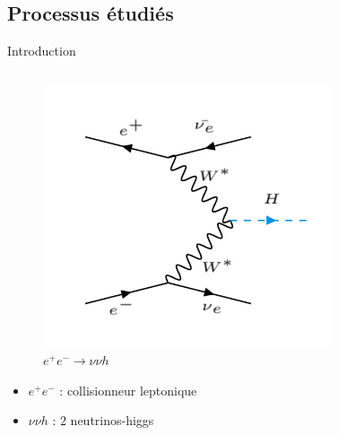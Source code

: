 \documentclass[9pt]{beamer}
\begin{document}
\subsection{Processus étudiés}
\begin{frame}{Introduction}

	\begin{columns}
	
		\begin{column}{0.3\textwidth}
			\begin{figure}
				\centering
				\includegraphics[width=0.8\textwidth]{../img/FeynmanHiggs_nnh.png} 
				\caption{$ e^{+} e^{-} \longrightarrow \nu \nu h $}
			\end{figure}
			
			\begin{itemize}
				\item $e^{+} e^{-}$ : collisionneur leptonique
				\item $\nu \nu h$ : 2 neutrinos-higgs
			\end{itemize}
			
		\end{column}
		
	
		\begin{column}{0.3\textwidth}
		

\end{column}
\end{columns}
\end{frame}
\end{document}
